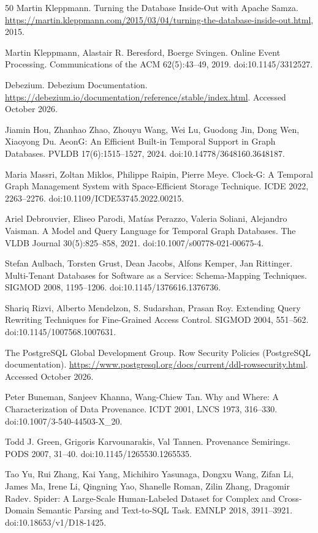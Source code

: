 \documentclass[sigconf, nonacm]{acmart}
\begin{document}
\begin{thebibliography}{50}
Martin Kleppmann. Turning the Database Inside-Out with Apache Samza. \url{https://martin.kleppmann.com/2015/03/04/turning-the-database-inside-out.html}, 2015.

Martin Kleppmann, Alastair R. Beresford, Boerge Svingen. Online Event Processing. Communications of the ACM 62(5):43--49, 2019. doi:10.1145/3312527.

Debezium. Debezium Documentation. \url{https://debezium.io/documentation/reference/stable/index.html}. Accessed October 2026.

Jiamin Hou, Zhanhao Zhao, Zhouyu Wang, Wei Lu, Guodong Jin, Dong Wen, Xiaoyong Du. AeonG: An Efficient Built-in Temporal Support in Graph Databases. PVLDB 17(6):1515--1527, 2024. doi:10.14778/3648160.3648187.

Maria Massri, Zoltan Miklos, Philippe Raipin, Pierre Meye. Clock-G: A Temporal Graph Management System with Space-Efficient Storage Technique. ICDE 2022, 2263--2276. doi:10.1109/ICDE53745.2022.00215.

Ariel Debrouvier, Eliseo Parodi, Mat\'ias Perazzo, Valeria Soliani, Alejandro Vaisman. A Model and Query Language for Temporal Graph Databases. The VLDB Journal 30(5):825--858, 2021. doi:10.1007/s00778-021-00675-4.

Stefan Aulbach, Torsten Grust, Dean Jacobs, Alfons Kemper, Jan Rittinger. Multi-Tenant Databases for Software as a Service: Schema-Mapping Techniques. SIGMOD 2008, 1195--1206. doi:10.1145/1376616.1376736.

Shariq Rizvi, Alberto Mendelzon, S. Sudarshan, Prasan Roy. Extending Query Rewriting Techniques for Fine-Grained Access Control. SIGMOD 2004, 551--562. doi:10.1145/1007568.1007631.

The PostgreSQL Global Development Group. Row Security Policies (PostgreSQL documentation). \url{https://www.postgresql.org/docs/current/ddl-rowsecurity.html}. Accessed October 2026.

Peter Buneman, Sanjeev Khanna, Wang-Chiew Tan. Why and Where: A Characterization of Data Provenance. ICDT 2001, LNCS 1973, 316--330. doi:10.1007/3-540-44503-X\_20.

Todd J. Green, Grigoris Karvounarakis, Val Tannen. Provenance Semirings. PODS 2007, 31--40. doi:10.1145/1265530.1265535.

Tao Yu, Rui Zhang, Kai Yang, Michihiro Yasunaga, Dongxu Wang, Zifan Li, James Ma, Irene Li, Qingning Yao, Shanelle Roman, Zilin Zhang, Dragomir Radev. Spider: A Large-Scale Human-Labeled Dataset for Complex and Cross-Domain Semantic Parsing and Text-to-SQL Task. EMNLP 2018, 3911--3921. doi:10.18653/v1/D18-1425.


\end{thebibliography}
\end{document}

